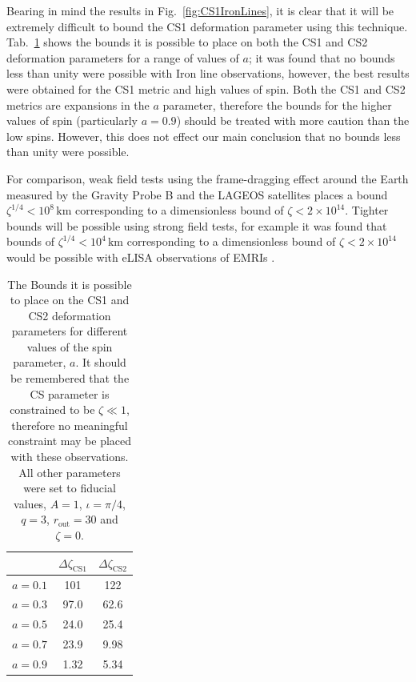 Bearing in mind the results in Fig.\ \ref{fig:CS1IronLines}, it is clear that it will be extremely difficult to bound the CS1 deformation parameter using this technique. Tab.\ \ref{tab:CS1} shows the bounds it is possible to place on both the CS1 and CS2 deformation parameters for a range of values of $a$; it was found that no bounds less than unity were possible with Iron line observations, however, the best results were obtained for the CS1 metric and high values of spin. Both the CS1 and CS2 metrics are expansions in the $a$ parameter, therefore the bounds for the higher values of spin (particularly $a=0.9$) should be treated with more caution than the low spins. However, this does not effect our main conclusion that no bounds less than unity were possible. 

For comparison, weak field tests using the frame-dragging effect around the Earth measured by the Gravity Probe B and the LAGEOS satellites places a bound $\zeta^{1/4}<10^{8}\,\textrm{km}$ \citep{2011PhRvD..84l4033A} corresponding to a dimensionless bound of $\zeta < 2\times 10^{14}$. Tighter bounds will be possible using strong field tests, for example it was found that bounds of $\zeta^{1/4}<10^{4}\,\textrm{km}$ corresponding to a dimensionless bound of $\zeta < 2\times 10^{14}$ would be possible with eLISA observations of EMRIs \citep{2012PhRvD..86d4010C}.

\begin{table}[h]
\begin{center}
\begin{tabular}{ l | c  c }
	&$\Delta \zeta_{\textrm{CS1}}$ &$\Delta\zeta_{\textrm{CS2}}$\\
\hline
$a=0.1$ & 101  & 122	\\
$a=0.3$ & 97.0 & 62.6	\\
$a=0.5$ & 24.0 & 25.4	\\
$a=0.7$ & 23.9 & 9.98	\\
$a=0.9$ & 1.32 & 5.34	\\
\end{tabular}
\end{center}
\caption{The Bounds it is possible to place on the CS1 and CS2 deformation parameters for different values of the spin parameter, $a$. It should be remembered that the CS parameter is constrained to be $\zeta\ll 1$, therefore no meaningful constraint may be placed with these observations. All other parameters were set to fiducial values, $A=1$, $\iota=\pi/4$, $q=3$, $r_{\textrm{out}}=30$ and $\zeta=0$.}
\label{tab:CS1}
\end{table}

